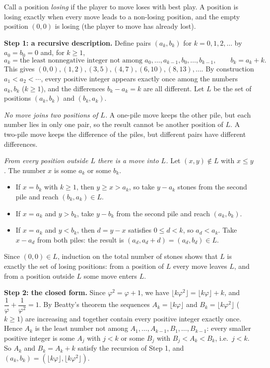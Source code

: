 Call a position \emph{losing} if the player to move loses with best play. A position is losing exactly when every move leads to a non-losing position, and the empty position $(0,0)$ is losing (the player to move has already lost).

\textbf{Step 1: a recursive description.} Define pairs $(a_k,b_k)$ for $k=0,1,2,\dots$ by $a_0=b_0=0$ and, for $k\ge1$,
\[
a_k=\text{the least nonnegative integer not among } a_0,\dots,a_{k-1},b_0,\dots,b_{k-1},\qquad b_k=a_k+k .
\]
This gives $(0,0),(1,2),(3,5),(4,7),(6,10),(8,13),\dots$. By construction $a_1<a_2<\cdots$, every positive integer appears exactly once among the numbers $a_k,b_k$ ($k\ge1$), and the differences $b_k-a_k=k$ are all different. Let $L$ be the set of positions $(a_k,b_k)$ and $(b_k,a_k)$.

\emph{No move joins two positions of $L$.} A one-pile move keeps the other pile, but each number lies in only one pair, so the result cannot be another position of $L$. A two-pile move keeps the difference of the piles, but different pairs have different differences.

\emph{From every position outside $L$ there is a move into $L$.} Let $(x,y)\notin L$ with $x\le y$. The number $x$ is some $a_k$ or some $b_k$.
\begin{itemize}
\item If $x=b_k$ with $k\ge1$, then $y\ge x>a_k$, so take $y-a_k$ stones from the second pile and reach $(b_k,a_k)\in L$.
\item If $x=a_k$ and $y>b_k$, take $y-b_k$ from the second pile and reach $(a_k,b_k)$.
\item If $x=a_k$ and $y<b_k$, then $d=y-x$ satisfies $0\le d<k$, so $a_d<a_k$. Take $x-a_d$ from both piles: the result is $(a_d,a_d+d)=(a_d,b_d)\in L$.
\end{itemize}
Since $(0,0)\in L$, induction on the total number of stones shows that $L$ is exactly the set of losing positions: from a position of $L$ every move leaves $L$, and from a position outside $L$ some move enters $L$.

\textbf{Step 2: the closed form.} Since $\varphi^2=\varphi+1$, we have $\lfloor k\varphi^2\rfloor=\lfloor k\varphi\rfloor+k$, and $\dfrac{1}{\varphi}+\dfrac{1}{\varphi^2}=1$. By Beatty's theorem the sequences $A_k=\lfloor k\varphi\rfloor$ and $B_k=\lfloor k\varphi^2\rfloor$ ($k\ge1$) are increasing and together contain every positive integer exactly once. Hence $A_k$ is the least number not among $A_1,\dots,A_{k-1},B_1,\dots,B_{k-1}$: every smaller positive integer is some $A_j$ with $j<k$ or some $B_j$ with $B_j<A_k<B_k$, i.e.\ $j<k$. So $A_k$ and $B_k=A_k+k$ satisfy the recursion of Step 1, and $(a_k,b_k)=(\lfloor k\varphi\rfloor,\lfloor k\varphi^2\rfloor)$.

